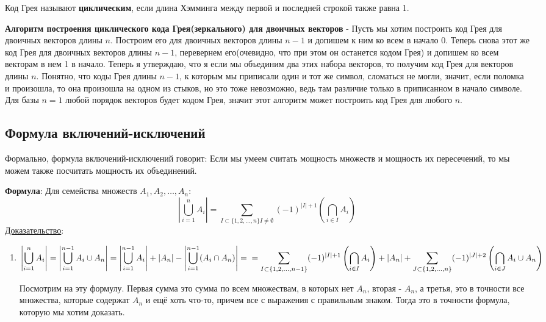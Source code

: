 \documentclass{article}
\begin{document}
Код Грея называют \textbf{циклическим}, если длина Хэмминга между первой и последней строкой также равна 1.

\textbf{Алгоритм построения циклического кода Грея(зеркального) для двоичных векторов} - Пусть мы хотим построить код Грея для двоичных векторов длины $n$. Построим его для двоичных векторов длины $n-1$ и допишем к ним ко всем в начало 0. Теперь снова этот же код Грея для двоичных векторов длины $n-1$, перевернем его(очевидно, что при этом он останется кодом Грея) и допишем ко всем векторам в нем 1 в начало. Теперь я утверждаю, что я если мы объединим два этих набора векторов, то получим код Грея для векторов длины $n$. Понятно, что коды Грея длины $n-1$, к которым мы приписали один и тот же символ, сломаться не могли, значит, если поломка и произошла, то она произошла на одном из стыков, но это тоже невозможно, ведь там различие только в приписанном в начало символе. Для базы $n=1$ любой порядок векторов будет кодом Грея, значит этот алгоритм может построить код Грея для любого $n$.

\subsection{Формула включений-исключений}
Формально, формула включений-исключений говорит: Если мы умеем считать мощность множеств и мощность их пересечений, то мы можем также посчитать мощность их объединений.

\textbf{Формула}: Для семейства множеств $A_1, A_2, \dots, A_n$: $$\left|\bigcup\limits_{i=1}^{n}A_i\right|=\sum\limits_{I\subset \{1, 2,\dots,n\} I \neq \emptyset}(-1)^{|I|+1}\left(\bigcap\limits_{i\in I}A_i\right)$$
\uline{Доказательство}:
\begin{enumerate}
    \item[] $\displaystyle\left|\bigcup\limits_{i=1}^{n}A_i\right|=\left|\bigcup\limits_{i=1}^{n - 1}A_i \cup A_n\right| = \left|\bigcup\limits_{i=1}^{n - 1}A_i\right| + \left|A_n\right| - \left|\bigcup\limits_{i=1}^{n - 1}(A_i\cap A_n)\right|=\\=\sum\limits_{I\subset \{1, 2,\dots,n-1\}}(-1)^{|I|+1}\left(\bigcap\limits_{i\in I}A_i\right)+|A_n|+\sum\limits_{J\subset \{1, 2,\dots,n\}}(-1)^{|J|+2}\left(\bigcap\limits_{i\in J}A_i\cup A_n\right)$
    
    Посмотрим на эту формулу. Первая сумма это сумма по всем множествам, в которых нет $A_n$, вторая - $A_n$, а третья, это в точности все множества, которые содержат $A_n$ и ещё хоть что-то, причем все с выражения с правильным знаком. Тогда это в точности формула, которую мы хотим доказать.
\end{enumerate}
\end{document}
